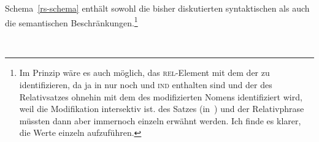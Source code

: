 Schema~\ref{rs-schema} enthält sowohl die bisher diskutierten syntaktischen als auch die semantischen
Beschränkungen.\footnote{%
Im Prinzip wäre es auch möglich, das \textsc{rel}-Element mit dem \contw der \nbar zu
identifizieren, da ja in \cont nur noch \ltop und \textsc{ind} enthalten
sind und der \ltopw des Relativsatzes ohnehin mit dem \ltopw des modifizierten Nomens identifiziert
wird, weil die Modifikation intersektiv ist. \ltopw des Satzes (in \,) und \ltopw der
Relativphrase müssten dann aber immernoch einzeln erwähnt werden. Ich finde es klarer, die Werte einzeln aufzuführen.
}
\newpage

\begin{schema}[Relativsatzschema]
\label{rs-schema}
 \impl\\
\end{schema}

